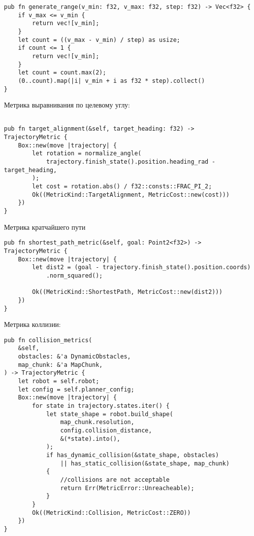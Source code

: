 \begin{lstlisting}
pub fn generate_range(v_min: f32, v_max: f32, step: f32) -> Vec<f32> {
    if v_max <= v_min {
        return vec![v_min];
    }
    let count = ((v_max - v_min) / step) as usize;
    if count <= 1 {
        return vec![v_min];
    }
    let count = count.max(2);
    (0..count).map(|i| v_min + i as f32 * step).collect()
}
\end{lstlisting}

Метрика выравнивания по целевому углу: 
\begin{lstlisting}

pub fn target_alignment(&self, target_heading: f32) -> TrajectoryMetric {
    Box::new(move |trajectory| {
        let rotation = normalize_angle(
            trajectory.finish_state().position.heading_rad - target_heading,
        );
        let cost = rotation.abs() / f32::consts::FRAC_PI_2;
        Ok((MetricKind::TargetAlignment, MetricCost::new(cost)))
    })
}
\end{lstlisting}

Метрика кратчайшего пути
\begin{lstlisting}
pub fn shortest_path_metric(&self, goal: Point2<f32>) -> TrajectoryMetric {
    Box::new(move |trajectory| {
        let dist2 = (goal - trajectory.finish_state().position.coords)
            .norm_squared();

        Ok((MetricKind::ShortestPath, MetricCost::new(dist2)))
    })
}
\end{lstlisting}


Метрика коллизии:
\begin{lstlisting}
pub fn collision_metrics(
    &self,
    obstacles: &'a DynamicObstacles,
    map_chunk: &'a MapChunk,
) -> TrajectoryMetric {
    let robot = self.robot;
    let config = self.planner_config;
    Box::new(move |trajectory| {
        for state in trajectory.states.iter() {
            let state_shape = robot.build_shape(
                map_chunk.resolution,
                config.collision_distance,
                &(*state).into(),
            );
            if has_dynamic_collision(&state_shape, obstacles)
                || has_static_collision(&state_shape, map_chunk)
            {
                //collisions are not acceptable
                return Err(MetricError::Unreacheable);
            }
        }
        Ok((MetricKind::Collision, MetricCost::ZERO))
    })
}
\end{lstlisting}


